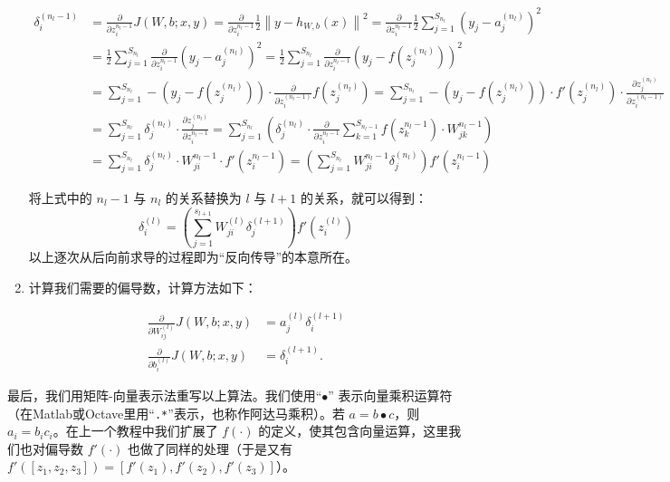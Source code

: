 \begin{enumerate}
{\begin{align}
\delta^{(n_l-1)}_i &=\frac{\partial}{\partial z^{n_l-1}_i}J(W,b;x,y)
 = \frac{\partial}{\partial z^{n_l-1}_i}\frac{1}{2} \left\|y - h_{W,b}(x)\right\|^2 
 = \frac{\partial}{\partial z^{n_l-1}_i}\frac{1}{2} \sum_{j=1}^{S_{n_l}}(y_j-a_j^{(n_l)})^2 \\
&= \frac{1}{2} \sum_{j=1}^{S_{n_l}}\frac{\partial}{\partial z^{n_l-1}_i}(y_j-a_j^{(n_l)})^2
 = \frac{1}{2} \sum_{j=1}^{S_{n_l}}\frac{\partial}{\partial z^{n_l-1}_i}(y_j-f(z_j^{(n_l)}))^2 \\
&= \sum_{j=1}^{S_{n_l}}-(y_j-f(z_j^{(n_l)})) \cdot \frac{\partial}{\partial z_i^{(n_l-1)}}f(z_j^{(n_l)})
 = \sum_{j=1}^{S_{n_l}}-(y_j-f(z_j^{(n_l)})) \cdot  f'(z_j^{(n_l)}) \cdot \frac{\partial z_j^{(n_l)}}{\partial z_i^{(n_l-1)}} \\
&= \sum_{j=1}^{S_{n_l}} \delta_j^{(n_l)} \cdot \frac{\partial z_j^{(n_l)}}{\partial z_i^{n_l-1}}
 = \sum_{j=1}^{S_{n_l}} \left(\delta_j^{(n_l)} \cdot \frac{\partial}{\partial z_i^{n_l-1}}\sum_{k=1}^{S_{n_l-1}}f(z_k^{n_l-1}) \cdot W_{jk}^{n_l-1}\right) \\
&= \sum_{j=1}^{S_{n_l}} \delta_j^{(n_l)} \cdot  W_{ji}^{n_l-1} \cdot f'(z_i^{n_l-1})
 = \left(\sum_{j=1}^{S_{n_l}}W_{ji}^{n_l-1}\delta_j^{(n_l)}\right)f'(z_i^{n_l-1})
\end{align}

将上式中的 $n_l-1$ 与 $n_l$ 的关系替换为 $l$ 与 $l+1$ 的关系，就可以得到：
$$\delta^{(l)}_i = \left( \sum_{j=1}^{s_{l+1}} W^{(l)}_{ji} \delta^{(l+1)}_j \right) f'(z^{(l)}_i)$$
以上逐次从后向前求导的过程即为“反向传导”的本意所在。
}

  \item
{}
    {计算我们需要的偏导数，计算方法如下：}
    {}

\begin{align}
\frac{\partial}{\partial W_{ij}^{(l)}} J(W,b; x, y) &= a^{(l)}_j \delta_i^{(l+1)} \\
\frac{\partial}{\partial b_{i}^{(l)}} J(W,b; x, y) &= \delta_i^{(l+1)}.
\end{align}

\end{enumerate}

    {最后，我们用矩阵-向量表示法重写以上算法。我们使用“$\bullet$” 表示向量乘积运算符（在Matlab或Octave里用“\texttt{.*}”表示，也称作阿达马乘积）。若 $a = b \bullet c$，则 $a_i = b_ic_i$。在上一个教程中我们扩展了 $f(\cdot)$ 的定义，使其包含向量运算，这里我们也对偏导数 $f'(\cdot)$ 也做了同样的处理（于是又有  $f'([z_1, z_2, z_3]) = [f'(z_1), f'(z_2), f'(z_3)]$）。}
    {}


